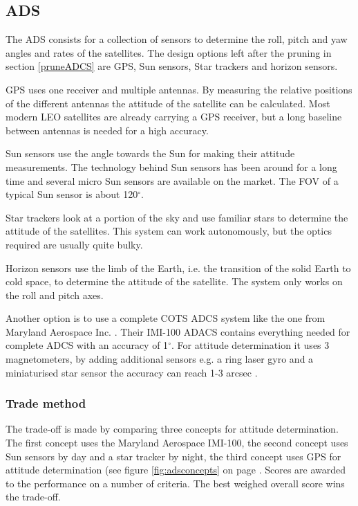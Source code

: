 \subsection{\acl{ADS}}
\label{ss:ads}
The \ac{ADS} consists for a collection of sensors to determine the roll, pitch and yaw angles and rates of the satellites. The design options left after the pruning in section \ref{pruneADCS} are \ac{GPS}, Sun sensors, Star trackers and horizon sensors. 

\ac{GPS} uses one receiver and multiple antennas. By measuring the relative positions of the different antennas the attitude of the satellite can be calculated. Most modern \ac{LEO} satellites are already carrying a \ac{GPS} receiver, but a long baseline between antennas is needed for a high accuracy. 

Sun sensors use the angle towards the Sun for making their attitude measurements. The technology behind Sun sensors has been around for a long time and several micro Sun sensors are available on the market. The \ac{FOV} of a typical Sun sensor is about 120${}^{\circ}$.

Star trackers look at a portion of the sky and use familiar stars to determine the attitude of the satellites. This system can work autonomously, but the optics required are usually quite bulky.

Horizon sensors use the limb of the Earth, i.e. the transition of the solid Earth to cold space, to determine the attitude of the satellite. The system only works on the roll and pitch axes.

Another option is to use a complete \ac{COTS} \ac{ADCS} system like the one from Maryland Aerospace Inc. \cite{maryland}. Their IMI-100 ADACS contains everything needed for complete \ac{ADCS} with an accuracy of 1${}^\circ$. For attitude determination it uses 3 magnetometers, by adding additional sensors e.g. a ring laser gyro and a miniaturised star sensor the accuracy can reach 1-3 arcsec \cite{imi100}.

\subsubsection{Trade method}
The trade-off is made by comparing three concepts for attitude determination. The first concept uses the Maryland Aerospace IMI-100, the second concept uses Sun sensors by day and a star tracker by night, the third concept uses \ac{GPS} for attitude determination (see figure \ref{fig:adsconcepts} on page \pageref{fig:adsconcepts}. Scores are awarded to the performance on a number of criteria. The best weighed overall score wins the trade-off.

